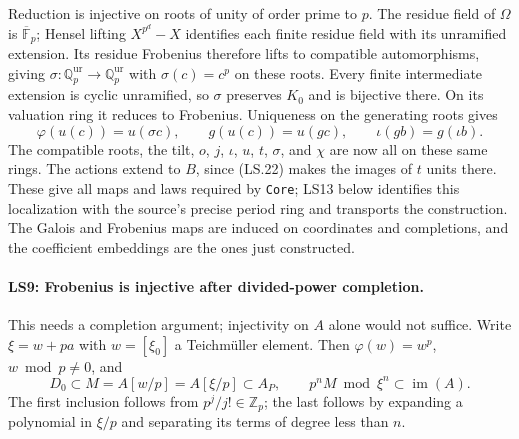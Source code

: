 Reduction is injective on roots of unity of order prime to $p$.
The residue field of $\Omega$ is $\overline{\mathbb F}_p$; Hensel
lifting $X^{p^d}-X$ identifies each finite residue field with its
unramified extension. Its residue Frobenius therefore lifts to
compatible automorphisms, giving
$\sigma:\mathbb Q_p^{\mathrm{ur}}\to\mathbb Q_p^{\mathrm{ur}}$
with $\sigma(c)=c^p$ on these roots. Every finite intermediate
extension is cyclic unramified, so $\sigma$ preserves $K_0$ and
is bijective there. On its valuation ring it reduces to Frobenius.
Uniqueness on the generating roots gives
\[
 \varphi(u(c))=u(\sigma c),\qquad
 g(u(c))=u(gc),\qquad\iota(gb)=g(\iota b).         \tag{LS.25}
\]
The compatible roots, the tilt, $o$, $j$, $\iota$, $u$, $t$,
$\sigma$, and $\chi$ are now all on these same rings. The actions
extend to $B$, since (LS.22) makes the images of $t$ units there.
These give all maps and laws required by \texttt{Core}; LS13 below
identifies this localization with the source's precise period ring
and transports the construction. The Galois and Frobenius maps
are induced on coordinates and completions, and the coefficient
embeddings are the ones just constructed.

\paragraph{LS9: Frobenius is injective after divided-power completion.}
This needs a completion argument; injectivity on $A$ alone would
not suffice. Write $\xi=w+pa$ with $w=[\xi_0]$ a Teichm\"uller
element. Then $\varphi(w)=w^p$, $w\bmod p\ne0$, and
\[
 D_0\subset M=A[w/p]=A[\xi/p]\subset A_P,
 \qquad p^nM\bmod\xi^n\subset\operatorname{im}(A).
 \tag{LS.26}
\]
The first inclusion follows from $p^j/j!\in\mathbb Z_p$; the
last follows by expanding a polynomial in $\xi/p$ and separating
its terms of degree less than $n$.

